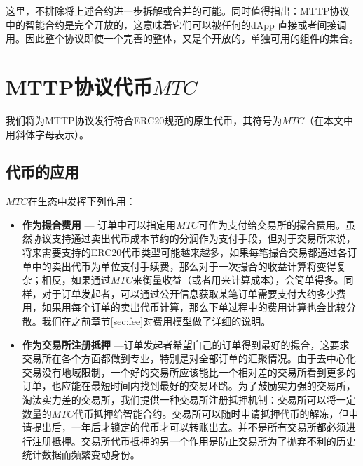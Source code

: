 \documentclass[UTF8,nofonts]{ctexart}
\begin{document}
这里，不排除将上述合约进一步拆解或合并的可能。同时值得指出：MTTP协议中的智能合约是完全开放的，这意味着它们可以被任何的dApp 直接或者间接调用。因此整个协议即使一个完善的整体，又是个开放的，单独可用的组件的集合。

\section{MTTP协议代币$MTC$\label{sec:protocoltoken}}


我们将为MTTP协议发行符合ERC20规范的原生代币，其符号为$MTC$（在本文中用斜体字母表示）。


\subsection{代币的应用}

$MTC$在生态中发挥下列作用：

\begin{itemize}
  \item \textbf{作为撮合费用} --- 订单中可以指定用$MTC$可作为支付给交易所的撮合费用。虽然协议支持通过卖出代币成本节约的分润作为支付手段，但对于交易所来说，将来需要支持的ERC20代币类型可能越来越多，如果每笔撮合交易都通过各订单中的卖出代币为单位支付手续费，那么对于一次撮合的收益计算将变得复杂；相反，如果通过$MTC$来衡量收益（或者用来计算成本），会简单得多。同样，对于订单发起者，可以通过公开信息获取某笔订单需要支付大约多少费用，如果用每个订单的卖出代币计算，那么下单过程中的费用计算也会比较分散。我们在之前章节\ref{sec:fee}对费用模型做了详细的说明。
  \item \textbf{作为交易所注册抵押} ---订单发起者希望自己的订单得到最好的撮合，这要求交易所在各个方面都做到专业，特别是对全部订单的汇聚情况。由于去中心化交易没有地域限制，一个好的交易所应该能比一个相对差的交易所看到更多的订单，也应能在最短时间内找到最好的交易环路。为了鼓励实力强的交易所，淘汰实力差的交易所，我们提供一种交易所注册抵押机制：交易所可以将一定数量的$MTC$代币抵押给智能合约。交易所可以随时申请抵押代币的解冻，但申请提出后，一年后才锁定的代币才可以转账出去。并不是所有交易所都必须进行注册抵押。交易所代币抵押的另一个作用是防止交易所为了抛弃不利的历史统计数据而频繁变动身份。
\end{itemize}
\end{document}
